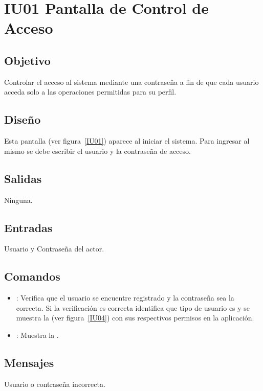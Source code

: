 \section{IU01 Pantalla de Control de Acceso}

\subsection{Objetivo}
	Controlar el acceso al sistema mediante una contraseña a fin de que cada usuario acceda solo a las operaciones permitidas para su perfil.

\subsection{Diseño}
	Esta pantalla  (ver figura~\ref{IU01}) aparece al iniciar el sistema. Para ingresar al mismo se debe escribir el usuario y la contraseña de acceso. 


\subsection{Salidas}

	Ninguna.

\subsection{Entradas}
Usuario y Contraseña del actor.

\subsection{Comandos}
\begin{itemize}
	\item {}: Verifica que el usuario se encuentre registrado y la contraseña sea la correcta. Si la verificación es correcta identifica que tipo de usuario es y se muestra la  (ver figura~\ref{IU04}) con sus respectivos permisos en la aplicación.
	\item {}: Muestra la .
\end{itemize}

\subsection{Mensajes}
\begin{Citemize}
	\item Usuario o contraseña incorrecta.
\end{Citemize}

\clearpage